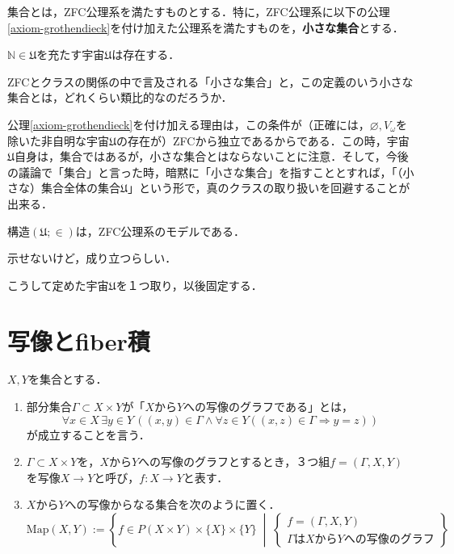 \documentclass[uplatex, dvipdfmx]{jsreport}
\begin{document}
\begin{definition}[小さな集合]
    集合とは，ZFC公理系を満たすものとする．特に，ZFC公理系に以下の公理\ref{axiom-grothendieck}を付け加えた公理系を満たすものを，\textbf{小さな集合}とする．
    \begin{axiom}[Grothendieck宇宙の存在]\label{axiom-grothendieck}
        $\mathbb{N}\in\mathfrak{U}$を充たす宇宙$\mathfrak{U}$は存在する．
    \end{axiom}
\end{definition}
\begin{remark}
    ZFCとクラスの関係の中で言及される「小さな集合」と，この定義のいう小さな集合とは，どれくらい類比的なのだろうか．
\end{remark}
公理\ref{axiom-grothendieck}を付け加える理由は，この条件が（正確には，$\varnothing,V_\omega$を除いた非自明な宇宙$\mathfrak{U}$の存在が）ZFCから独立であるからである．この時，宇宙$\mathfrak{U}$自身は，集合ではあるが，小さな集合とはならないことに注意．そして，今後の議論で「集合」と言った時，暗黙に「小さな集合」を指すこととすれば，「（小さな）集合全体の集合$\mathfrak{U}$」という形で，真のクラスの取り扱いを回避することが出来る．
\begin{proposition}
    構造$(\mathfrak{U};\in)$は，ZFC公理系のモデルである．
\end{proposition}
示せないけど，成り立つらしい．

こうして定めた宇宙$\mathfrak{U}$を１つ取り，以後固定する．

\section{写像とfiber積}

\begin{definition}[mapping]$X,Y$を集合とする．
    \begin{enumerate}
        \item 部分集合$\Gamma\subset X\times Y$が「$X$から$Y$への写像のグラフである」とは，\[\forall x\in X\, \exists y\in Y \, ((x,y)\in\Gamma\wedge \forall z\in Y((x,z)\in\Gamma\Rightarrow y=z))\]が成立することを言う．
        \item $\Gamma\subset X\times Y$を，$X$から$Y$への写像のグラフとするとき，３つ組$f=(\Gamma,X,Y)$を写像$X\to Y$と呼び，$f:X\to Y$と表す．
        \item $X$から$Y$への写像からなる集合を次のように置く．
        \[\mathrm{Map}(X,Y):=\left\{ f\in P(X\times Y)\times \{ X\}\times\{ Y\} \;\middle|\; \begin{cases}
            f=(\Gamma,X,Y)\\
            \Gamma はXからYへの写像のグラフ
        \end{cases}\right\}\]
    \end{enumerate}
\end{definition}
\end{document}
